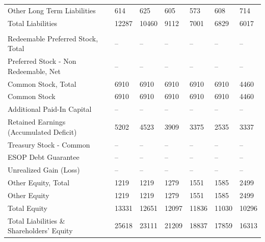 \documentclass[grad,numbers]{coppe}
\begin{document}
\begin{longtable}[t]{lllllll}
  \hspace{1em}\hspace{1em}Other Long Term Liabilities & 614 & 625 & 605 & 573 & 608 & 714\\
  \hspace{1em}Total Liabilities & 12287 & 10460 & 9112 & 7001 & 6829 & 6017\\
  \addlinespace[0.3em]
  \multicolumn{7}{l}{\textbf{Shareholders' Equity}}\\
  \hspace{1em}Redeemable Preferred Stock, Total & -- & -- & -- & -- & -- & --\\
  \hspace{1em}Preferred Stock - Non Redeemable, Net & -- & -- & -- & -- & -- & --\\
  \hspace{1em}Common Stock, Total & 6910 & 6910 & 6910 & 6910 & 6910 & 4460\\
  \hspace{1em}\hspace{1em}Common Stock & 6910 & 6910 & 6910 & 6910 & 6910 & 4460\\
  \hspace{1em}Additional Paid-In Capital & -- & -- & -- & -- & -- & --\\
  \hspace{1em}Retained Earnings (Accumulated Deficit) & 5202 & 4523 & 3909 & 3375 & 2535 & 3337\\
  \hspace{1em}Treasury Stock - Common & -- & -- & -- & -- & -- & --\\
  \hspace{1em}ESOP Debt Guarantee & -- & -- & -- & -- & -- & --\\
  \hspace{1em}Unrealized Gain (Loss) & -- & -- & -- & -- & -- & --\\
  \hspace{1em}Other Equity, Total & 1219 & 1219 & 1279 & 1551 & 1585 & 2499\\
  \hspace{1em}\hspace{1em}Other Equity & 1219 & 1219 & 1279 & 1551 & 1585 & 2499\\
  \hspace{1em}Total Equity & 13331 & 12651 & 12097 & 11836 & 11030 & 10296\\
  \hspace{1em}Total Liabilities \& Shareholders' Equity & 25618 & 23111 & 21209 & 18837 & 17859 & 16313\\*
  \end{longtable}
\end{document}
